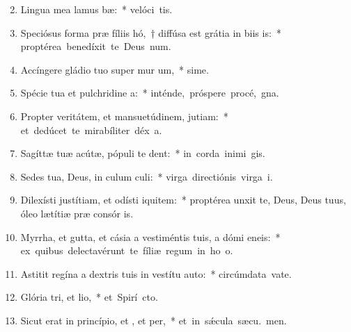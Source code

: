 \begin{flushleft}
\begin{enumerate}[leftmargin=*]
\setcounter{enumi}{1}

\item Lingua mea lamus bæ:~* \mbox{velóci tis.}
\item Speciósus forma præ fíliis hó,~† diffúsa est grátia in biis is:~* \mbox{proptérea benedíxit te Deus  num.}
\item Accíngere gládio tuo super mur um,~* \mbox{sime.}
\item Spécie tua et pulchridine a:~* \mbox{inténde, próspere procé,  gna.}
\item Propter veritátem, et mansuetúdinem,  jutiam:~* \mbox{et dedúcet te mirabíliter déx a.}
\item Sagíttæ tuæ acútæ, pópuli  te dent:~* \mbox{in corda inimi gis.}
\item Sedes tua, Deus, in culum culi:~* \mbox{virga directiónis virga  i.}
\item Dilexísti justítiam, et odísti iquitem:~* proptérea unxit te, Deus, Deus tuus, óleo lætítiæ præ consór is.
\item Myrrha, et gutta, et cásia a vestiméntis tuis, a dómi eneis:~* \mbox{ex quibus delectavérunt te fíliæ regum in ho o.}
\item Astitit regína a dextris tuis in vestítu auto:~* \mbox{circúmdata vate.}
\item Glória tri, et lio,~* \mbox{et Spirí cto.}
\item Sicut erat in princípio, et , et per,~* \mbox{et in s\'{\ae}cula sæcu. men.}


\end{enumerate}
\end{flushleft}

